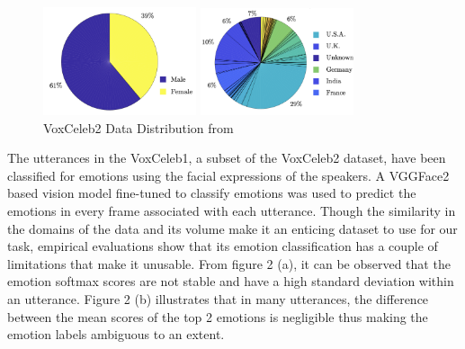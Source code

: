 \documentclass{article}
\begin{document}
\begin{figure}[htb]

\begin{minipage}[b]{.48\linewidth}
  \centering
  \centerline{\includegraphics[width=4.5cm]{voxceleb2_1}}
\end{minipage}
\hfill
\begin{minipage}[b]{0.48\linewidth}
  \centering
  \centerline{\includegraphics[width=4.5cm]{voxceleb2_2}}
\end{minipage}
  \caption{VoxCeleb2 Data Distribution from \cite{iemocap}}
\end{figure}

The utterances in the VoxCeleb1, a subset of the VoxCeleb2 dataset, have been classified for emotions using the facial expressions of the speakers. A VGGFace2 based vision model fine-tuned to classify emotions was used to predict the emotions in every frame associated with each utterance. Though the similarity in the domains of the data and its volume make it an enticing dataset to use for our task, empirical evaluations show that its emotion classification has a couple of limitations that make it unusable. From figure 2 (a), it can be observed that the emotion softmax scores are not stable and have a high standard deviation within an utterance. Figure 2 (b) illustrates that in many utterances, the difference between the mean scores of the top 2 emotions is negligible thus making the emotion labels ambiguous to an extent.
\end{document}
